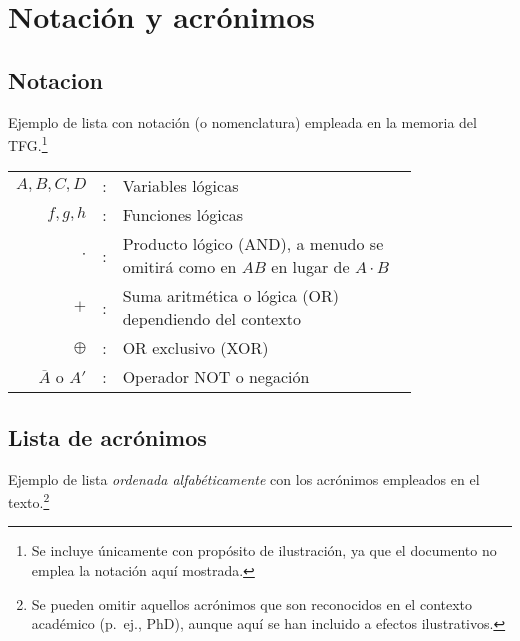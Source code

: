 %
%
\cleardoublepage
{} %


\chapter*{Notación y acrónimos} %

\section*{Notacion}
Ejemplo de lista con notación (o nomenclatura) empleada en la memoria del TFG.\footnote{Se incluye únicamente con propósito de ilustración, ya que el documento no emplea la notación aquí mostrada.}

\begin{tabular}{r r p{0.8\linewidth}}
$A, B, C, D$	& : & Variables lógicas \\
$f, g, h$		& :	& Funciones lógicas \\
$\cdot$			& : & Producto lógico (AND), a menudo se omitirá como en $A 
B$ en lugar de $A \cdot B$\\
$+$				& : & Suma aritmética o lógica (OR) dependiendo del 
contexto\\
$\oplus$		& : & OR exclusivo (XOR)\\
$\overline{A}$ o ${A}'$	& : & Operador NOT o negación
\end{tabular}

\section*{Lista de acrónimos}
Ejemplo de lista \emph{ordenada alfabéticamente} con los acrónimos empleados en el texto.\footnote{Se pueden omitir aquellos acrónimos que son reconocidos en el contexto académico (p.~ej., PhD), aunque aquí se han incluido a efectos ilustrativos.}

